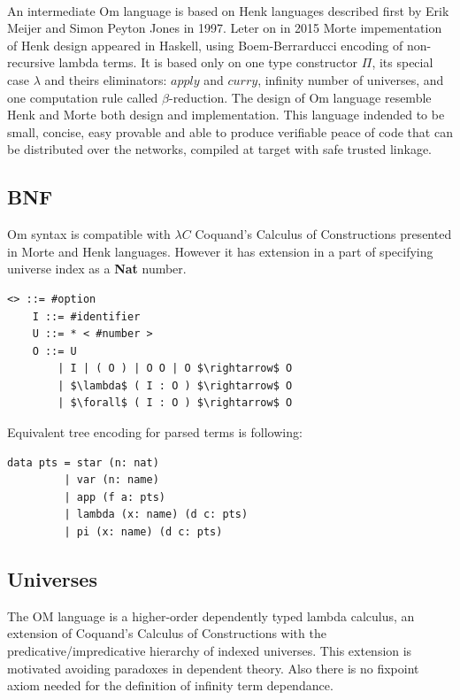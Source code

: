 \documentclass[11pt,oneside]{article}
\begin{document}
   \paragraph{}
   An intermediate Om language is based on Henk\cite{henk} languages described first
   by Erik Meijer and Simon Peyton Jones in 1997. Leter on in 2015 Morte impementation
   of Henk design appeared in Haskell, using Boem-Berrarducci encoding of non-recursive lambda terms.
   It is based only on one type constructor $\Pi$, its special case $\lambda$ and theirs eliminators:
   $apply$ and $curry$, infinity number of universes,
   and one computation rule called $\beta$-reduction.
   The design of Om language resemble Henk and Morte both
   design and implementation. This language indended to be small, concise, easy provable
   and able to produce verifiable peace of code that can be distributed over the networks,
   compiled at target with safe trusted linkage.

   \subsection{BNF}
\vspace{0.5cm}
   Om syntax is compatible with $\lambda C$ Coquand's Calculus of Constructions presented
   in Morte and Henk languages. However it has extension in a part of specifying
   universe index as a {\bf Nat} number.

\vspace{0.5cm}
\begin{lstlisting}[mathescape=true]
   <> ::= #option
    I ::= #identifier
    U ::= * < #number >
    O ::= U
        | I | ( O ) | O O | O $\rightarrow$ O
        | $\lambda$ ( I : O ) $\rightarrow$ O
        | $\forall$ ( I : O ) $\rightarrow$ O
\end{lstlisting}

Equivalent tree encoding for parsed terms is following:
\vspace{0.5cm}
\begin{lstlisting}[mathescape=true]
data pts = star (n: nat)
         | var (n: name)
         | app (f a: pts)
         | lambda (x: name) (d c: pts)
         | pi (x: name) (d c: pts)
\end{lstlisting}

\newpage
\subsection{Universes}

The OM language is a higher-order dependently typed lambda calculus,
an extension of Coquand's Calculus of Constructions
with the predicative/impredicative hierarchy of indexed universes.
This extension is motivated avoiding paradoxes in dependent theory.
Also there is no fixpoint axiom needed for the definition
of infinity term dependance.
\end{document}

